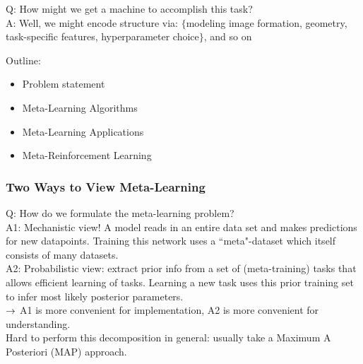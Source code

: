 Q: How might we get a machine to accomplish this task?  \\

A: Well, we might encode structure via: $\{$modeling image formation, geometry, task-specific features, hyperparameter choice$\}$, and so on \\


Outline:
\begin{itemize}
\item Problem statement
\item Meta-Learning Algorithms
\item Meta-Learning Applications
\item Meta-Reinforcement Learning
\end{itemize}

\subsubsection{Two Ways to View Meta-Learning}

Q: How do we formulate the meta-learning problem? \\

A1: Mechanistic view! A model reads in an entire data set and makes predictions for new datapoints. Training this network uses a ``meta"-dataset which itself consists of many datasets. \\

A2: Probabilistic view: extract prior info from a set of (meta-training) tasks that allows efficient learning of tasks. Learning a new task uses this prior training set to infer most likely posterior parameters. \\

$\rightarrow$ A1 is more convenient for implementation, A2 is more convenient for understanding. \\

Hard to perform this decomposition in general: usually take a Maximum A Posteriori (MAP) approach. \\

